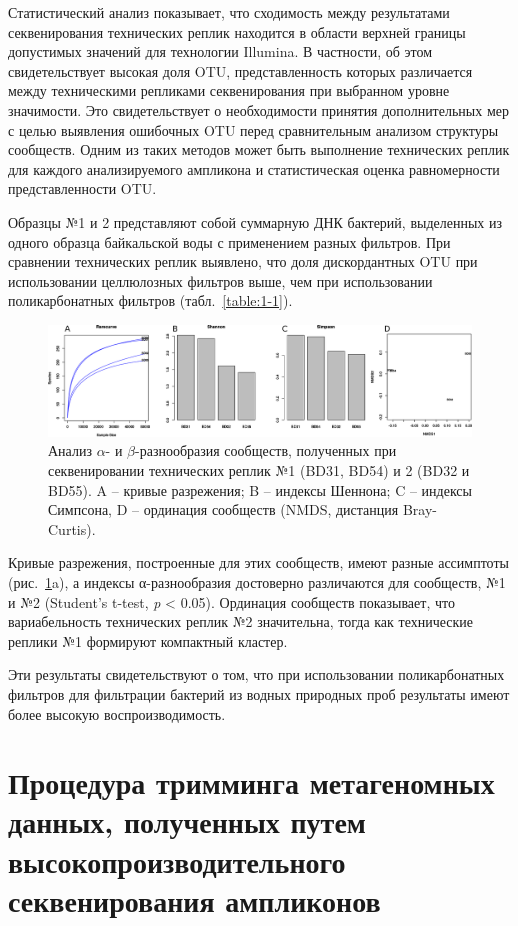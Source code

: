 \documentclass[a4paper,12pt,openany,final]{extreport}
\def\oldcaption{} \let\oldcaption=\caption
\def\caption{\stepcounter{captionsnum}\oldcaption}
\begin{document}
Статистический анализ показывает, что сходимость между результатами секвенирования технических реплик находится в области верхней границы допустимых значений для технологии Illumina. В частности, об этом свидетельствует высокая доля OTU, представленность которых различается между техническими репликами секвенирования при выбранном уровне значимости. Это свидетельствует о необходимости принятия дополнительных мер с целью
выявления ошибочных OTU перед сравнительным анализом структуры
сообществ. Одним из таких методов может быть выполнение технических
реплик для каждого анализируемого ампликона и статистическая оценка
равномерности представленности OTU.

Образцы №1 и 2 представляют собой суммарную ДНК бактерий, выделенных из
одного образца байкальской воды с применением разных фильтров. При
сравнении технических реплик выявлено, что доля дискордантных OTU при
использовании целлюлозных фильтров выше, чем при использовании
поликарбонатных фильтров (табл.~\ref{table:1-1}).

\begin{figure}\centering
  \includegraphics[width=0.9\linewidth]{media/image6.png}
  \caption{Анализ \(\alpha\)- и \(\beta\)-разнообразия сообществ, полученных при секвенировании
технических реплик №1 (BD31, BD54) и 2 (BD32 и BD55). A -- кривые
разрежения; B -- индексы Шеннона; C -- индексы Симпсона, D -- ординация
сообществ (NMDS, дистанция Bray-Curtis).}\label{fig:2}
\end{figure}


Кривые разрежения, построенные для этих сообществ, имеют разные
ассимптоты (рис.~\ref{fig:2}a), а индексы α-разнообразия достоверно различаются
для сообществ, №1 и №2 (Student's t-test, \emph{p} \textless{} 0.05).
Ординация сообществ показывает, что вариабельность технических реплик №2
значительна, тогда как технические реплики №1 формируют компактный
кластер.

Эти результаты свидетельствуют о том, что при использовании
поликарбонатных фильтров для фильтрации бактерий из водных природных
проб результаты имеют более высокую воспроизводимость.

\chapter{Процедура тримминга метагеномных данных, полученных путем высокопроизводительного секвенирования ампликонов}\label{chap:2}
\end{document}
